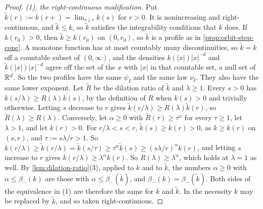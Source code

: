 \begin{proof}
\emph{(1), the right-continuous modification.} Put $\tilde k(r) := k(r{+}) = \lim_{s \downarrow r}k(s)$ for $r > 0$.
It is nonincreasing and right-continuous, and $\tilde k \le k$, so $\tilde k$ satisfies the
integrability conditions that $k$ does. If $k(r_0) > 0$, then $\tilde k \ge k(r_0)$ on
$(0, r_0)$, so $\tilde k$ is a profile as in \ref{prop:orbit-step-cone}. A monotone function has at most
countably many discontinuities, so $\tilde k = k$ off a countable subset of $(0, \infty)$, and the densities
$k(|x|)|x|^{-d}$ and $\tilde k(|x|)|x|^{-d}$ agree off the set of the $x$ with $|x|$ in that countable set,
a null set of $\mathbb{R}^d$. So the two profiles have the same
$\psi_I$ and the same law $\nu_I$. They also have the same lower exponent. Let $\tilde R$ be the dilation ratio of
$\tilde k$ and $\lambda \ge 1$. Every $s > 0$ has $k(s/\lambda) \ge R(\lambda)k(s)$, by the definition of $R$ when
$k(s) > 0$ and trivially otherwise. Letting $s$ decrease to $r$ gives $\tilde k(r/\lambda) \ge R(\lambda)\tilde k(r)$,
so $\tilde R(\lambda) \ge R(\lambda)$. Conversely, let $\alpha \ge 0$ with $\tilde R(\tau) \ge \tau^\alpha$ for every
$\tau \ge 1$, let $\lambda > 1$, and let $k(r) > 0$. For $r/\lambda < s < r$, $\tilde k(s) \ge k(r) > 0$, as
$k \ge k(r)$ on $(s, r)$, and $\tau := s\lambda/r > 1$. So
$k(r/\lambda) \ge \tilde k(r/\lambda) = \tilde k(s/\tau) \ge \tau^\alpha\tilde k(s) \ge (s\lambda/r)^\alpha k(r)$, and
letting $s$ increase to $r$ gives $k(r/\lambda) \ge \lambda^\alpha k(r)$. So $R(\lambda) \ge \lambda^\alpha$, which
holds at $\lambda = 1$ as well. By \ref{lem:dilation-ratio}(3), applied to $k$ and to $\tilde k$, the numbers
$\alpha \ge 0$ with $\alpha \le \beta_-(k)$ are those with $\alpha \le \beta_-(\tilde k)$, and
$\beta_-(k) = \beta_-(\tilde k)$. Both sides of the equivalence in (1) are therefore the same for $k$ and $\tilde k$.
In the necessity $k$ may be replaced by $\tilde k$, and so taken right-continuous.


\end{proof}
